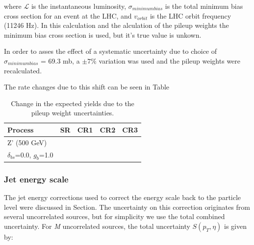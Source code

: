 where $\mathcal{L}$ is the instantaneous luminosity, $\sigma_{minimum bias}$ is the total minimum bias cross section for an event at the LHC, and $v_{orbit}$ is the LHC orbit frequency (11246 Hz). In this calculation and the alculation of the pileup weights the minimum bias cross section is used, but it's true value is unkown. 

In order to asses the effect of a systematic uncertainty due to choice of $\sigma_{minimum bias}$ = 69.3 mb, a $\pm 7\%$ variation was used and the pileup weights were recalculated.

The rate changes due to this shift can be seen in Table 

\begin{table}[hbtp]\footnotesize
	\centering
	\begin{tabular}{l l l l l}
		\hline
		\textbf{Process} & SR & CR1 & CR2 & CR3 \\
		\hline
		Z' (500 GeV) &  & & &  \\
		$\delta_{bs}$=0.0, $g_{b}$=1.0  &  & & &  \\
		\hline
	\end{tabular}
	\caption{Change in the expected yields due to the pileup weight uncertainties.}
	\label{tab:pu_rate}
\end{table}



\subsubsection{Jet energy scale}
The jet energy corrections used to correct the energy scale back to the particle level were discussed in Section. The uncertainty on this correction originates from several uncorrelated sources, but for simplicity we use the total combined uncertainty. For \textit{M} uncorrelated sources, the total uncertainty $S(p_{T},\eta)$ is given by:







